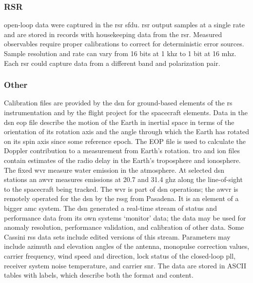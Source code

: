 \documentclass[crop=false,class=article,oneside]{standalone}
\begin{document}
        \subsubsection{\footnotesize{RSR}}
            \label{subsubsec:usr_RSR}
            \Gls{open-loop} data were captured in the
            \gls{rsr} \gls{sfdu}. \gls{rsr} output samples
            at a single rate and are stored in records with
            housekeeping data from the \gls{rsr}. Measured
            observables require proper calibrations to
            correct for deterministic error sources. Sample
            resolution and rate can vary from 16 \glspl{bit}
            at 1 \gls{khz} to 1 \gls{bit} at 16 \gls{mhz}.
            Each \gls{rsr} could capture data from a
            different band and \gls{polarization} pair.
        \subsubsection{\footnotesize{Other}}
            Calibration files are provided by the \gls{dsn}
            for ground-based elements of the \gls{rs}
            instrumentation and by the flight project for
            the spacecraft elements. Data in the \gls{dsn}
            \gls{eop} file describe the motion of the Earth
            in inertial space in terms of the orientation of
            its rotation axis and the angle through which the
            Earth has rotated on its spin axis since some
            reference epoch. The EOP file is used to calculate
            the Doppler contribution to a measurement from
            Earth's rotation. \gls{tro} and \gls{ion} files
            contain estimates of the radio delay in the
            Earth's troposphere and ionosphere. The fixed
            \gls{wvr} measure water emission in the
            atmosphere. At selected \gls{dsn} stations
            an \gls{awvr} measures emissions
            at 20.7 and 31.4 \gls{ghz} along the
            line-of-sight to the spacecraft being tracked.
            The \gls{wvr} is part of \gls{dsn} operations;
            the \gls{awvr} is remotely operated for the
            \gls{dsn} by the \gls{rssg} from Pasadena.
            It is an element of a bigger \gls{amc} system.
            The \gls{dsn} generated a real-time stream of
            status and performance data from its own
            systems `monitor’ data; the data may be used
            for anomaly resolution, performance validation,
            and calibration of other data. Some Cassini
            \gls{rss} data sets include edited versions of
            this stream. Parameters may include \gls{azimuth}
            and \gls{elevation} angles of the antenna,
            \gls{monopulse} correction values, \gls{carrier}
            \gls{frequency}, wind speed and direction,
            lock status of the \gls{closed-loop} \gls{pll},
            receiver system noise temperature,
            and \gls{carrier} \gls{snr}. The data are stored
            in ASCII tables with labels, which describe both
            the format and content.
\end{document}
